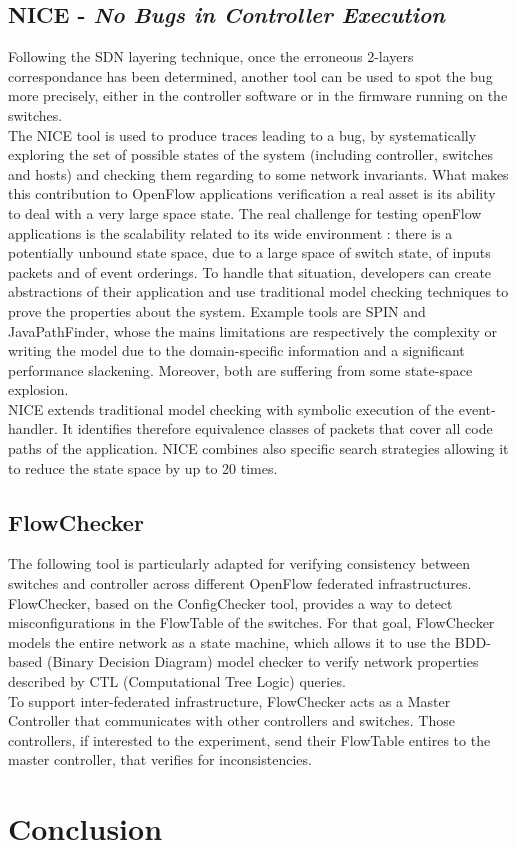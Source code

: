 \documentclass[10pt,article]{IEEEtran}
\begin{document}
\subsection{NICE - \textit{No Bugs in Controller Execution}}

Following the SDN layering technique, once the erroneous 2-layers correspondance has been determined, another tool can be used to spot the bug more precisely, either in the controller software or in the firmware running on the switches.\\
The NICE tool is used to produce traces leading to a bug, by systematically exploring the set of possible states of the system (including controller, switches and hosts) and checking them regarding to some network invariants\cite{Canini:2012:NWT:2228298.2228312}. What makes this contribution to OpenFlow applications verification a real asset is its ability to deal with a very large space state. The real challenge for testing openFlow applications is the scalability related to its wide environment : there is a potentially unbound state space, due to a large space of switch state, of inputs packets and of event orderings\cite{Canini:2012:NWT:2228298.2228312}. To handle that situation, developers can create abstractions of their application and use traditional model checking techniques to prove the properties about the system. Example tools are SPIN and JavaPathFinder, whose the mains limitations are respectively the complexity or writing the model due to the domain-specific information and a significant performance slackening\cite{Peresini:2011:YOA:2079327.2079345}. Moreover, both are suffering from some state-space explosion.\\
NICE extends traditional model checking with symbolic execution of the event-handler. It identifies therefore equivalence classes of packets that cover all code paths of the application. NICE combines also specific search strategies allowing it to reduce the state space by up to 20 times\cite{Canini:2012:NWT:2228298.2228312}.

\subsection{FlowChecker}

The following tool is particularly adapted for verifying consistency between switches and controller across different OpenFlow federated infrastructures. FlowChecker, based on the ConfigChecker tool, provides a way to detect misconfigurations in the FlowTable of the switches\cite{canini2011automating}. For that goal, FlowChecker models the entire network as a state machine, which allows it to use the BDD-based (Binary Decision Diagram) model checker to verify network properties described by CTL (Computational Tree Logic) queries\cite{Al-Shaer:2010:FCA:1866898.1866905}.\\
To support inter-federated infrastructure, FlowChecker acts as a Master Controller that communicates with other controllers and switches. Those controllers, if interested to the experiment, send their FlowTable entires to the master controller, that verifies for inconsistencies.

\section{Conclusion}




\end{document}
